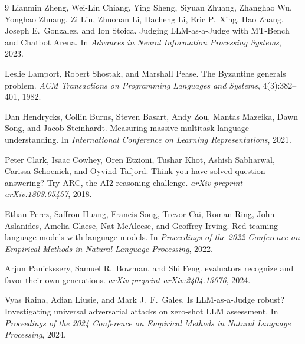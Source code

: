 \documentclass[11pt,a4paper]{article}
\begin{document}
\begin{thebibliography}{9}
Lianmin Zheng, Wei-Lin Chiang, Ying Sheng, Siyuan Zhuang, Zhanghao Wu, Yonghao Zhuang, Zi Lin, Zhuohan Li, Dacheng Li, Eric P.\ Xing, Hao Zhang, Joseph E.\ Gonzalez, and Ion Stoica.
\newblock Judging {LLM}-as-a-{J}udge with {MT-B}ench and {C}hatbot {A}rena.
\newblock In \emph{Advances in Neural Information Processing Systems}, 2023.

Leslie Lamport, Robert Shostak, and Marshall Pease.
\newblock The {B}yzantine generals problem.
\newblock \emph{ACM Transactions on Programming Languages and Systems}, 4(3):382--401, 1982.

Dan Hendrycks, Collin Burns, Steven Basart, Andy Zou, Mantas Mazeika, Dawn Song, and Jacob Steinhardt.
\newblock Measuring massive multitask language understanding.
\newblock In \emph{International Conference on Learning Representations}, 2021.

Peter Clark, Isaac Cowhey, Oren Etzioni, Tushar Khot, Ashish Sabharwal, Carissa Schoenick, and Oyvind Tafjord.
\newblock Think you have solved question answering? {T}ry {ARC}, the {AI2} reasoning challenge.
\newblock \emph{arXiv preprint arXiv:1803.05457}, 2018.

Ethan Perez, Saffron Huang, Francis Song, Trevor Cai, Roman Ring, John Aslanides, Amelia Glaese, Nat McAleese, and Geoffrey Irving.
\newblock Red teaming language models with language models.
\newblock In \emph{Proceedings of the 2022 Conference on Empirical Methods in Natural Language Processing}, 2022.

Arjun Panickssery, Samuel R.\ Bowman, and Shi Feng.
 evaluators recognize and favor their own generations.
\newblock \emph{arXiv preprint arXiv:2404.13076}, 2024.

Vyas Raina, Adian Liusie, and Mark J.\ F.\ Gales.
\newblock Is {LLM}-as-a-{J}udge robust? {I}nvestigating universal adversarial attacks on zero-shot {LLM} assessment.
\newblock In \emph{Proceedings of the 2024 Conference on Empirical Methods in Natural Language Processing}, 2024.
\end{thebibliography}
\end{document}

